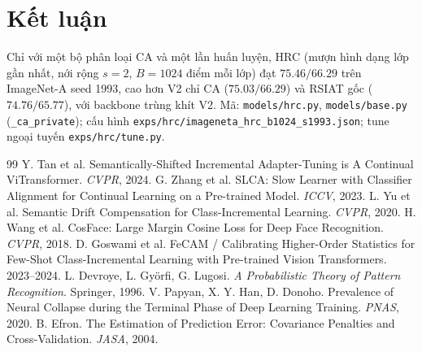 \documentclass[11pt]{article}
\begin{document}
\section{Kết luận}
Chỉ với một bộ phân loại CA và một lần huấn luyện, HRC (mượn hình dạng lớp gần nhất, nới rộng $s=2$, $B=1024$ điểm
mỗi lớp) đạt $75.46/66.29$ trên ImageNet-A seed 1993, cao hơn V2 chỉ CA ($75.03/66.29$) và RSIAT gốc ($74.76/65.77$),
với backbone trùng khít V2. Mã: \texttt{models/hrc.py}, \texttt{models/base.py} (\texttt{\_ca\_private}); cấu hình
\texttt{exps/hrc/imageneta\_hrc\_b1024\_s1993.json}; tune ngoại tuyến \texttt{exps/hrc/tune.py}.

\begin{thebibliography}{99}
 Y. Tan et al. Semantically-Shifted Incremental Adapter-Tuning is A Continual ViTransformer. \emph{CVPR}, 2024.
 G. Zhang et al. SLCA: Slow Learner with Classifier Alignment for Continual Learning on a Pre-trained Model. \emph{ICCV}, 2023.
 L. Yu et al. Semantic Drift Compensation for Class-Incremental Learning. \emph{CVPR}, 2020.
 H. Wang et al. CosFace: Large Margin Cosine Loss for Deep Face Recognition. \emph{CVPR}, 2018.
 D. Goswami et al. FeCAM / Calibrating Higher-Order Statistics for Few-Shot Class-Incremental Learning with Pre-trained Vision Transformers. 2023--2024.
 L. Devroye, L. Györfi, G. Lugosi. \emph{A Probabilistic Theory of Pattern Recognition}. Springer, 1996.
 V. Papyan, X. Y. Han, D. Donoho. Prevalence of Neural Collapse during the Terminal Phase of Deep Learning Training. \emph{PNAS}, 2020.
 B. Efron. The Estimation of Prediction Error: Covariance Penalties and Cross-Validation. \emph{JASA}, 2004.
\end{thebibliography}
\end{document}
